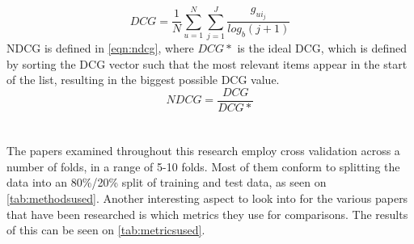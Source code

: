 \begin{equation}
    \label{eqn:dcg}
    DCG = \frac{1}{N} \sum\limits_{u=1}^N \sum\limits_{j = 1}^J \frac{g_{ui_j}}{log_b (j+1)}
\end{equation}
NDCG is defined in \autoref{eqn:ndcg}, where $DCG*$ is the ideal DCG, which is defined by sorting the DCG vector such that the most relevant items appear in the start of the list\cite{dcgpaper}, resulting in the biggest possible DCG value.
\begin{equation}
    \label{eqn:ndcg}
    NDCG = \frac{DCG}{DCG*}
\end{equation}
\\\\
The papers examined throughout this research employ cross validation across a number of folds, in a range of 5-10 folds.
Most of them conform to splitting the data into an 80\%/20\% split of training and test data, as seen on \autoref{tab:methodsused}.
Another interesting aspect to look into for the various papers that have been researched is which metrics they use for comparisons.
The results of this can be seen on \autoref{tab:metricsused}.

